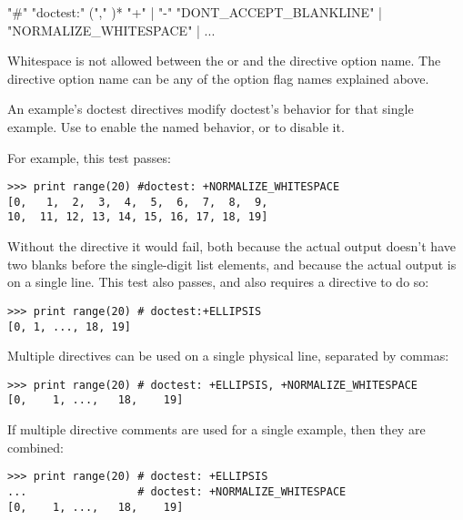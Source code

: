 \begin{productionlist}[doctest]
               {"\#" "doctest:" }
               { ("," )*}
               { }
               {"+" | "-"}
               {"DONT_ACCEPT_BLANKLINE" | "NORMALIZE_WHITESPACE" | ...}
\end{productionlist}

Whitespace is not allowed between the \code{+} or \code{-} and the
directive option name.  The directive option name can be any of the
option flag names explained above.

An example's doctest directives modify doctest's behavior for that
single example.  Use \code{+} to enable the named behavior, or
\code{-} to disable it.

For example, this test passes:

\begin{verbatim}
>>> print range(20) #doctest: +NORMALIZE_WHITESPACE
[0,   1,  2,  3,  4,  5,  6,  7,  8,  9,
10,  11, 12, 13, 14, 15, 16, 17, 18, 19]
\end{verbatim}

Without the directive it would fail, both because the actual output
doesn't have two blanks before the single-digit list elements, and
because the actual output is on a single line.  This test also passes,
and also requires a directive to do so:

\begin{verbatim}
>>> print range(20) # doctest:+ELLIPSIS
[0, 1, ..., 18, 19]
\end{verbatim}

Multiple directives can be used on a single physical line, separated
by commas:

\begin{verbatim}
>>> print range(20) # doctest: +ELLIPSIS, +NORMALIZE_WHITESPACE
[0,    1, ...,   18,    19]
\end{verbatim}

If multiple directive comments are used for a single example, then
they are combined:

\begin{verbatim}
>>> print range(20) # doctest: +ELLIPSIS
...                 # doctest: +NORMALIZE_WHITESPACE
[0,    1, ...,   18,    19]
\end{verbatim}

